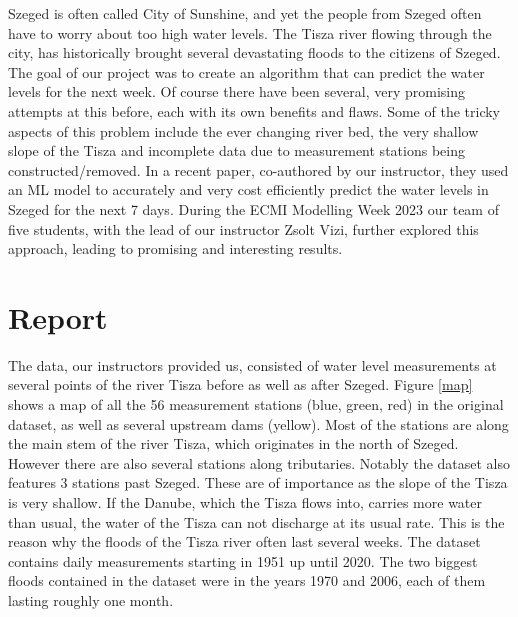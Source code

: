 \documentclass{article}
\begin{document}
Szeged is often called City of Sunshine, and yet the people from Szeged often
have to worry about too high water levels. The Tisza river flowing through the
city, has historically brought several devastating floods to the citizens of
Szeged. The goal of our project was to create an algorithm that can predict
the water levels for the next week. Of course there have been several, very
promising attempts at this before, each with its own benefits and flaws. Some
of the tricky aspects of this problem include the ever changing river bed, the
very shallow slope of the Tisza and incomplete data due to measurement
stations being constructed/removed. In a recent paper{\cite{WaterLevel2023}},
co-authored by our instructor, they used an ML model to accurately and very
cost efficiently predict the water levels in Szeged for the next 7 days.
During the ECMI Modelling Week 2023 our team of five students, with the lead
of our instructor Zsolt Vizi, further explored this approach, leading to
promising and interesting results.

\section{Report}

The data, our instructors provided us, consisted of water level measurements
at several points of the river Tisza before as well as after Szeged. Figure
\ref{map} shows a map of all the 56 measurement stations (blue, green, red) in
the original dataset, as well as several upstream dams (yellow). Most of the
stations are along the main stem of the river Tisza, which originates in the
north of Szeged. However there are also several stations along tributaries.
Notably the dataset also features 3 stations past Szeged. These are of
importance as the slope of the Tisza is very shallow. If the Danube, which the
Tisza flows into, carries more water than usual, the water of the Tisza can
not discharge at its usual rate. This is the reason why the floods of the
Tisza river often last several weeks. The dataset contains daily measurements
starting in 1951 up until 2020. The two biggest floods contained in the
dataset were in the years 1970 and 2006, each of them lasting roughly one
month.

\
\end{document}
